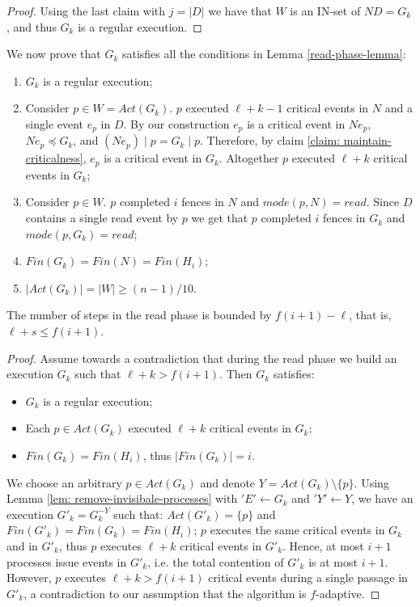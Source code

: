 \begin{proof}
	Using the last claim with $j = |D|$ we have that $W$ is an IN-set of $N D = G_k$, and thus $G_k$ is a regular execution.
\end{proof}
	
We now prove that $G_k$ satisfies all the conditions in Lemma \ref{read-phase-lemma}:
\begin{enumerate}[(1)]
	\item $G_k$ is a regular execution;
	\item Consider $p \in W = Act(G_k)$. $p$ executed $\ell+k-1$ critical events in $N$ and a single event $e_p$ in $D$. By our construction $e_p$ is a critical event in $N e_p$, $N e_p \preceq G_k$, and $(N e_p) \mid p = G_k \mid p$. Therefore, by claim \ref{claim: maintain-criticalness}, $e_p$ is a critical event in $G_k$. Altogether $p$ executed $\ell+k$ critical events in $G_k$;
	\item Consider $p \in W$. $p$ completed $i$ fences in $N$ and $mode(p,N) = read$. Since $D$ contains a single read event by $p$ we get that $p$ completed $i$ fences in $G_k$ and $mode(p,G_k) = read$;
	\item $Fin(G_k) = Fin(N) = Fin(H_i)$;
	\item $|Act(G_k)| = |W| \geq (n-1)/10$.
\end{enumerate}

\begin{claim-section} \label{claim: read-upper-bound}
	The number of steps in the read phase is bounded by $f(i+1)-\ell$, that is, $\ell+s \leq f(i+1)$.
\end{claim-section}

\begin{proof}
	Assume towards a contradiction that during the read phase we build an execution $G_k$ such that $\ell+k > f(i+1)$. Then $G_k$ satisfies:
	\begin{itemize}
		\item $G_k$ is a regular execution;
		\item Each $p \in Act(G_k)$ executed $\ell+k$ critical events in $G_k$;
		\item $Fin(G_k) = Fin(H_i)$, thus $|Fin(G_k)| = i$.
	\end{itemize}
	We choose an arbitrary $p \in Act(G_k)$ and denote $Y = Act(G_k) \setminus \{p\}$. Using Lemma \ref{lem: remove-invisibale-processes} with $'E' \leftarrow G_k$ and $'Y' \leftarrow Y$, we have an execution $G'_k = G_k^{-Y}$ such that: $Act(G'_k) = \{p\}$ and $Fin(G'_k) = Fin(G_k) = Fin(H_i)$; $p$ executes the same critical events in $G_k$ and in $G'_k$, thus $p$ executes $\ell+k$ critical events in $G'_k$. Hence, at most $i+1$ processes issue events in $G'_k$, i.e. the total contention of $G'_k$ is at most $i+1$. However, $p$ executes $\ell+k > f(i+1)$ critical events during a single passage in $G'_k$, a contradiction to our assumption that the algorithm is $f$-adaptive.
\end{proof}




